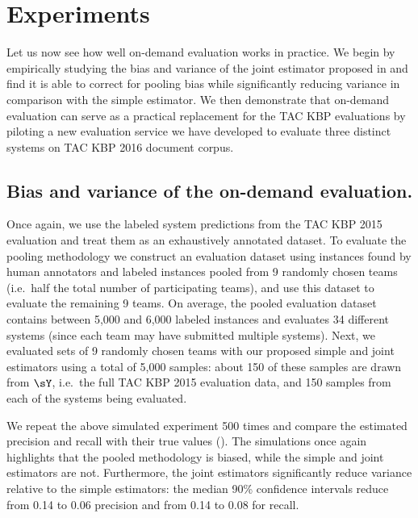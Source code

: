 \section{Experiments}
\label{sec:kbpo:evaluation}

Let us now see how well on-demand evaluation works in practice.
We begin by empirically studying the bias and variance of the joint estimator proposed in  and find it is able to correct for pooling bias while significantly reducing variance in comparison with the simple estimator.
We then demonstrate that on-demand evaluation can serve as a practical replacement for the TAC KBP evaluations by piloting a new evaluation service we have developed to evaluate three distinct systems on TAC KBP 2016 document corpus.

\subsection{Bias and variance of the on-demand evaluation.}
Once again, we use the labeled system predictions from the TAC KBP 2015 evaluation and treat them as an exhaustively annotated dataset.
To evaluate the pooling methodology we construct an evaluation dataset using
instances found by human annotators and labeled instances pooled from 9
randomly chosen teams (i.e.\ half the total number of participating teams), and
use this dataset to evaluate the remaining 9 teams.
On average, the pooled evaluation dataset contains between 5,000 and 6,000 labeled instances and evaluates 34 different systems (since each team may have submitted multiple systems).
Next, we evaluated sets of 9 randomly chosen teams with our proposed simple and joint estimators using a total of 5,000 samples:
about 150 of these samples are drawn from $\sY$, i.e.\ the full TAC KBP 2015 evaluation data, and 150 samples from each of the systems being evaluated.

We repeat the above simulated experiment 500 times and compare the estimated precision and recall with their true values ().
The simulations once again highlights that the pooled methodology is biased, while the simple and joint estimators are not.
Furthermore, the joint estimators significantly reduce variance relative to the simple estimators:
the median 90\% confidence intervals reduce from 0.14 to 0.06 precision and from 0.14 to 0.08 for recall.

